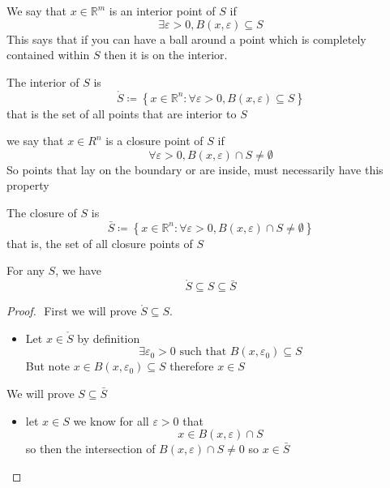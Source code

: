 \documentclass[11pt]{book}
\begin{document}
\begin{defn}\label{defn:interior_point}
    We say that $x \in \mathbb{R} ^{m} $ is an interior point of $S$ if 
    \[
    \exists \varepsilon  > 0, B\left(x, \varepsilon \right) \subseteq S
    \]
    This says that if you can have a ball around a point which is completely contained within $S$ then it is on the interior.
\end{defn}

\begin{defn}[Interior]\label{defn:interior}
    The interior of $S$ is 
    \[
        \mathring{S} \coloneqq \left\{ x\in \mathbb{R} ^{n} : \forall \varepsilon  > 0, B\left(x, \varepsilon \right) \subseteq S \right\} 
    \]
    that is the set of all points that are interior to $S$ 
\end{defn}

\newpage

\begin{defn}\label{defn:closure_point}
    we say that $x \in R^{n} $ is a closure point of $S$ if
    \[
    \forall \varepsilon  > 0, B\left(x, \varepsilon \right) \cap S \neq \emptyset  
    \]
    So points that lay on the boundary or are inside, must necessarily have this property
\end{defn}

\begin{defn}[Closure]\label{defn:closure}
    The closure of $S$ is
    \[
        \bar{S} \coloneqq \left\{ x \in \mathbb{R} ^{n} : \forall \varepsilon  > 0, B\left(x, \varepsilon \right) \cap S \neq \emptyset   \right\} 
    \]
    that is, the set of all closure points of $S$ 
\end{defn}

\begin{thm}\label{thm:connection_between_closure_and_interior}
    For any $S$, we have 
    \[
        \mathring{S} \subseteq S \subseteq \bar{S} 
    \]
\end{thm}

\begin{proof}
$ $\newline
    First we will prove $\mathring{S} \subseteq S$. 
    \begin{itemize}
        \item Let $x \in \mathring{S} $ by definition 
            \[
            \exists \varepsilon _{0}  > 0 \text{ such that } B\left(x, \varepsilon _{0} \right) \subseteq S 
            \]
            But note $x \in B\left(x, \varepsilon _{0} \right) \subseteq S$ therefore $x\in S$
    \end{itemize}
    We will prove $S \subseteq \bar{S} $ 
    \begin{itemize}
        \item let $x \in S$ we know for all $\varepsilon > 0$ that 
            \[
            x\in B\left(x, \varepsilon \right) \cap S
            \]
            so then the intersection of $B\left(x, \varepsilon \right) \cap S \neq 0 $ so $x \in \bar{S} $ 
    \end{itemize}
\end{proof}
\end{document}
